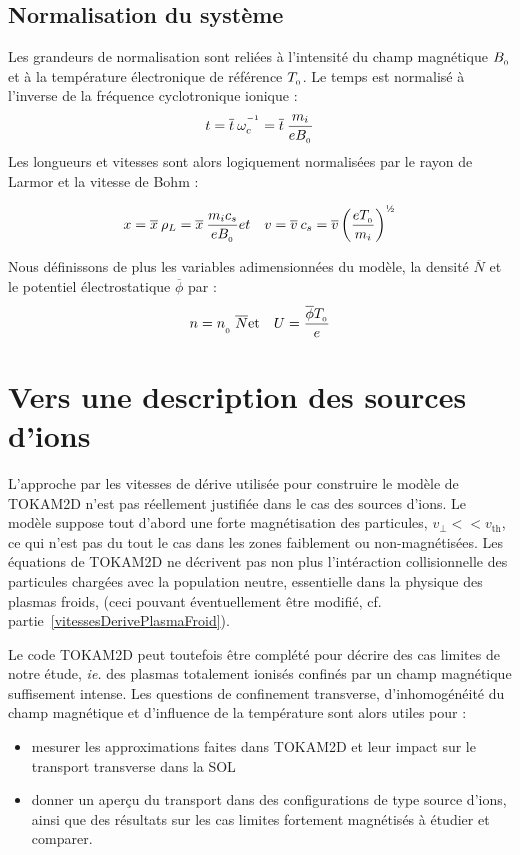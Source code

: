\begin{refsection}
\subsection{Normalisation du système}
Les grandeurs de normalisation sont reliées à l'intensité du champ magnétique
$B_{_{0}}$ et à la température électronique de référence $T_{_{0}}$. Le
temps est normalisé à l'inverse de la fréquence cyclotronique ionique :
\begin{equation}
t = \overline{t}\:\omega_c^{^{-1}} =
\overline{t}\:\frac{m_i}{eB_{_{0}}}
\end{equation}
Les longueurs et vitesses sont alors logiquement normalisées par le rayon de
Larmor et la vitesse de Bohm :

\begin{eqnarray}
x = \overline{x}\:\rho_L =
\overline{x}\:\frac{m_ic_s}{eB\indice{0}} &
et &
v=\overline{v}\:c_s=\overline{v}\left(\frac{eT\indice{0}}{m_i}\right)^{\text{\textonehalf}}
\end{eqnarray}

Nous définissons de plus les variables adimensionnées du modèle, la densité
$\overline{N}$ et le potentiel électrostatique $\overline \phi$ par :
\begin{eqnarray}
n = n_{_{_{0}}}\:\overline{N} & \text{et} & U=\frac{\overline
{\phi}T_{_{0}}}{e}
\end{eqnarray}
\vfill
\section{Vers une description des sources d'ions}
L'approche par les vitesses de dérive utilisée pour construire le modèle de TOKAM2D n'est pas 
réellement justifiée dans le cas des sources d'ions. Le modèle suppose tout d'abord une
forte magnétisation des particules, $v_\perp<<v_\text{th}$, ce qui n'est pas du tout le cas dans 
les zones faiblement ou non-magnétisées. Les équations de TOKAM2D ne décrivent pas non plus l'intéraction
collisionnelle des particules chargées avec la population neutre, essentielle dans la physique des plasmas froids,
(ceci pouvant éventuellement être modifié, cf.
partie~\ref{vitessesDerivePlasmaFroid}).

Le code TOKAM2D peut toutefois être complété pour décrire des cas limites de notre étude, \emph{ie.} des plasmas totalement ionisés
confinés par un champ magnétique suffisement intense. Les questions de confinement transverse, d'inhomogénéité du champ 
magnétique et d'influence de la température sont alors utiles pour :
\begin{itemize}
	\item mesurer les approximations faites dans TOKAM2D et leur impact sur le transport transverse dans la SOL
	\item donner un aperçu du transport dans des configurations de type source d'ions, ainsi que des résultats sur les 
	cas limites fortement magnétisés à étudier et comparer.
\end{itemize}

\end{refsection}
